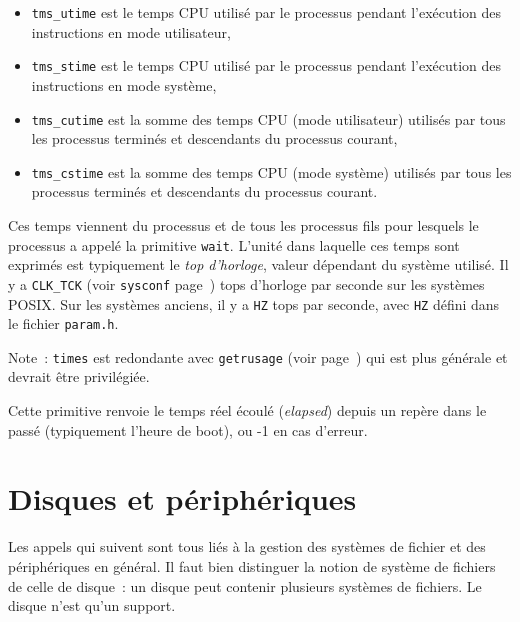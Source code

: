 \documentclass [twoside] {report}
\begin{document}
\begin {itemize}
    \item {\tt tms\_utime} est le temps CPU utilisé par le processus
	pendant l'exécution des instructions en mode utilisateur,

    \item {\tt tms\_stime} est le temps CPU utilisé par le processus
	pendant l'exécution des instructions en mode système,

    \item {\tt tms\_cutime} est la somme des temps CPU (mode
	utilisateur) utilisés par tous les processus terminés et
	descendants du processus courant,

    \item {\tt tms\_cstime} est la somme des temps CPU (mode système)
	utilisés par tous les processus terminés et descendants du
	processus courant.
\end {itemize}

Ces temps viennent du processus et de tous les processus fils pour
lesquels le processus a appelé la primitive {\tt wait}. L'unité dans
laquelle ces temps sont exprimés est typiquement le {\em top d'horloge},
valeur dépendant du système utilisé.
Il y a {\tt CLK\_TCK} (voir {\tt sysconf} page~\pageref {sysconf}) tops
d'horloge par seconde sur les systèmes POSIX. Sur les systèmes anciens,
il y a {\tt HZ} tops par seconde, avec {\tt HZ} défini dans le fichier
{\tt param.h}.

Note~: \texttt {times} est redondante avec \texttt {getrusage} (voir
page~\pageref {getrusage}) qui est plus générale et devrait être
privilégiée.

Cette primitive renvoie le temps réel écoulé ({\it elapsed}) depuis un
repère dans le passé (typiquement l'heure de boot), ou -1 en cas
d'erreur.



\section {Disques et périphériques}


Les appels qui suivent sont tous liés à la
gestion des systèmes de fichier et des périphériques en
général. Il faut bien distinguer la notion de
système de fichiers de celle de disque~: un disque
peut contenir plusieurs systèmes de fichiers. Le
disque n'est qu'un support.
\end{document}

